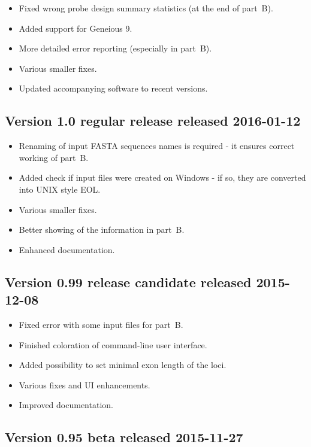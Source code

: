 \documentclass[a4paper, 11pt, twoside]{article}
\begin{document}
\begin{itemize}
  \item Fixed wrong probe design summary statistics (at the end of part~B).
  \item Added support for Geneious 9.
  \item More detailed error reporting (especially in part~B).
  \item Various smaller fixes.
  \item Updated accompanying software to recent versions.
\end{itemize}

\subsection{Version 1.0 regular release released 2016-01-12}

\begin{itemize}
  \item Renaming of input FASTA sequences names is required - it ensures correct working of part~B.
  \item Added check if input files were created on Windows - if so, they are converted into UNIX style EOL.
  \item Various smaller fixes.
  \item Better showing of the information in part~B.
  \item Enhanced documentation.
\end{itemize}

\subsection{Version 0.99 release candidate released 2015-12-08}

\begin{itemize}
  \item Fixed error with some input files for part~B.
  \item Finished coloration of command-line user interface.
  \item Added possibility to set minimal exon length of the loci.
  \item Various fixes and UI enhancements.
  \item Improved documentation.
\end{itemize}

\subsection{Version 0.95 beta released 2015-11-27}
\end{document}
